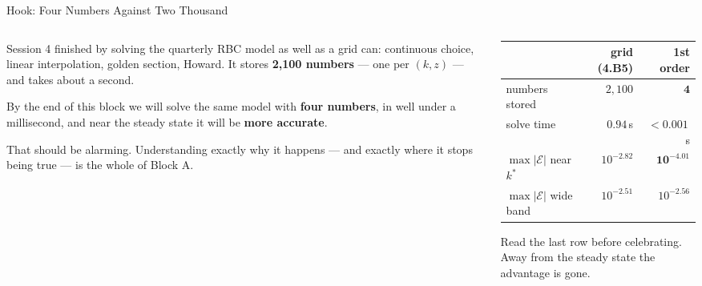 \begin{frame}{Hook: Four Numbers Against Two Thousand}
\begin{columns}[T]
\begin{column}{0.53\textwidth}
\small
Session 4 finished by solving the quarterly RBC model as well as a grid can: continuous choice, linear interpolation, golden section, Howard. It stores \textbf{2{,}100 numbers} --- one per $(k,z)$ --- and takes about a second.
\medskip

By the end of this block we will solve the same model with \textbf{four numbers}, in well under a millisecond, and near the steady state it will be \textbf{more accurate}.
\medskip

That should be alarming. Understanding exactly why it happens --- and exactly where it stops being true --- is the whole of Block A.
\end{column}
\begin{column}{0.44\textwidth}
\begin{center}\footnotesize
\begin{tabularx}{\linewidth}{@{}>{\raggedright\arraybackslash}p{2.35cm} r r@{}}
\toprule
 & \textbf{grid (4.B5)} & \textbf{1st order} \\
\midrule
numbers stored & $2{,}100$   & $\mathbf{4}$ \\
solve time     & $0.94$\,s   & $<0.001$\,s \\
$\max|\mathcal{E}|$ near $k^{*}$ & $10^{-2.82}$ & $\mathbf{10^{-4.01}}$ \\
$\max|\mathcal{E}|$ wide band    & $10^{-2.51}$ & $10^{-2.56}$ \\
\bottomrule
\end{tabularx}
\end{center}
\medskip
\begin{cautionbox}\footnotesize
Read the last row before celebrating. Away from the steady state the advantage is gone.
\end{cautionbox}
\end{column}
\end{columns}
\vspace{1mm}
\end{frame}

